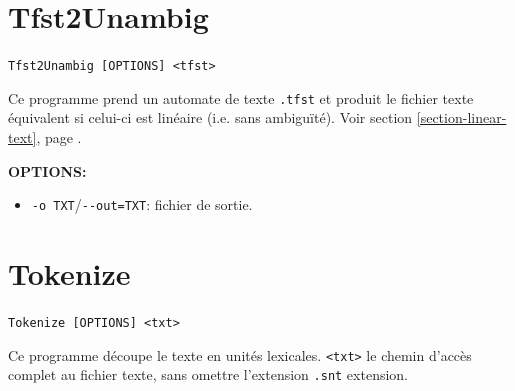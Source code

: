\section{Tfst2Unambig}
\verb+Tfst2Unambig [OPTIONS] <tfst>+

\bigskip
\noindent Ce programme prend un automate de texte \verb$.tfst$ et produit le fichier texte équivalent si celui-ci est linéaire (i.e. sans ambiguïté). Voir section \ref{section-linear-text}, page \pageref{section-linear-text}.

\bigskip
\noindent \textbf{OPTIONS:}
\begin{itemize}
\item \verb+-o TXT+/\verb+--out=TXT+: fichier de sortie.
\end{itemize}







\section{Tokenize}
\verb+Tokenize [OPTIONS] <txt>+

\bigskip
\noindent Ce programme découpe le texte en unités lexicales.
\verb+<txt>+ le chemin d’accès complet au fichier texte, sans omettre l’extension \verb+.snt+ 
extension.


